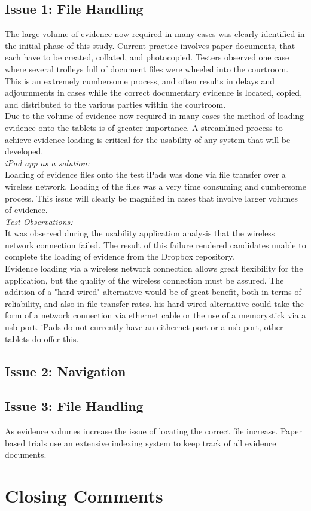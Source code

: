 \documentclass{article}
\begin{document}
\subsection{Issue 1: File Handling}
The large volume of evidence now required in many cases was clearly identified in the initial phase of this study. Current practice involves paper documents, that each have to be created, collated, and photocopied. Testers observed one case where several trolleys full of document files were wheeled into the courtroom. This is an extremely cumbersome process, and often results in delays and adjournments in cases while the correct documentary evidence is located, copied, and distributed to the various parties within the courtroom.\\
Due to the volume of evidence now required in many cases the method of loading evidence onto the tablets is of greater importance. A streamlined process to achieve evidence loading is critical for the usability of any system that will be developed.\\
\textit{iPad app as a solution:}\\
Loading of evidence files onto the test iPads was done via file transfer over a wireless network. Loading of the files was a very time consuming and cumbersome process. This issue will clearly be magnified in cases that involve larger volumes of evidence.\\
\textit{Test Observations:}\\
It was observed during the usability application analysis that the wireless network connection failed. The result of this failure rendered candidates unable to complete the loading of evidence from the Dropbox repository.\\
Evidence loading via a wireless network connection allows great flexibility for the application, but the quality of the wireless connection must be assured. The addition of a "hard wired" alternative would be of great benefit, both in terms of reliability, and also in file transfer rates. his hard wired alternative could take the form of a network connection via ethernet cable or the use of a memorystick via a usb port. iPads do not currently have an eithernet port or a usb port, other tablets do offer this.\\
\subsection{Issue 2: Navigation}


\subsection{Issue 3: File Handling}
As evidence volumes increase the issue of locating the correct file increase. Paper based trials use an extensive indexing system to keep track of all evidence documents.

\section{Closing Comments}
\end{document}
